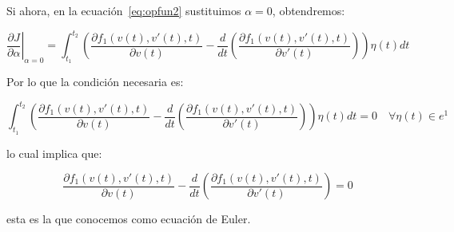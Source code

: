     Si ahora, en la ecuación~\ref{eq:opfun2} sustituimos $\alpha = 0$, obtendremos:

    \begin{equation*}
        \left. \frac{\partial J}{\partial \alpha} \right|_{\alpha=0} = \int_{t_1}^{t_2}\left( \frac{\partial f_1(v(t), v'(t), t)}{\partial v(t)} - \frac{d}{dt} \left( \frac{\partial f_1(v(t), v'(t), t)}{\partial v'(t)} \right) \right) \eta(t) dt
    \end{equation*}

    Por lo que la condición necesaria es:

    \begin{equation*}
        \int_{t_1}^{t_2}\left( \frac{\partial f_1(v(t), v'(t), t)}{\partial v(t)} - \frac{d}{dt} \left( \frac{\partial f_1(v(t), v'(t), t)}{\partial v'(t)} \right) \right) \eta(t) dt = 0 \quad \forall \eta(t) \in e^1
    \end{equation*}

    lo cual implica que:

    \begin{equation}
        \frac{\partial f_1(v(t), v'(t), t)}{\partial v(t)} - \frac{d}{dt} \left( \frac{\partial f_1(v(t), v'(t), t)}{\partial v'(t)} \right)  = 0
    \end{equation}

    esta es la que conocemos como ecuación de Euler.
